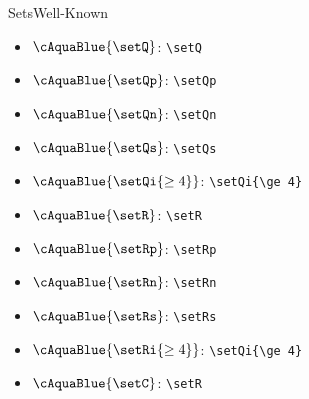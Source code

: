 \documentclass[\string~/GitHub/sthlmNordBeamerTheme/sthlmNordLightDemo.tex]{subfiles}
\begin{document}
\begin{frame}[fragile]{Sets}{Well-Known}
	\begin{minipage}[t]{0.3\textwidth}
		\vspace{0pt}
		\begin{itemize}
			\item \(\cAquaBlue{ \setQ } \): \verb!\setQ!
			\item \(\cAquaBlue{ \setQp } \): \verb!\setQp!
			\item \(\cAquaBlue{ \setQn } \): \verb!\setQn!
			\item \(\cAquaBlue{ \setQs } \): \verb!\setQs!
			\item \(\cAquaBlue{ \setQi{\ge 4} } \): \verb!\setQi{\ge 4}!
			\item \(\cAquaBlue{ \setR } \): \verb!\setR!
			\item \(\cAquaBlue{ \setRp } \): \verb!\setRp!
			\item \(\cAquaBlue{ \setRn } \): \verb!\setRn!
			\item \(\cAquaBlue{ \setRs } \): \verb!\setRs!
			\item \(\cAquaBlue{ \setRi{\ge 4} } \): \verb!\setQi{\ge 4}!
			\item \(\cAquaBlue{ \setC } \): \verb!\setR!
		\end{itemize}
	\end{minipage}
	\hfill

\end{frame}
\end{document}
